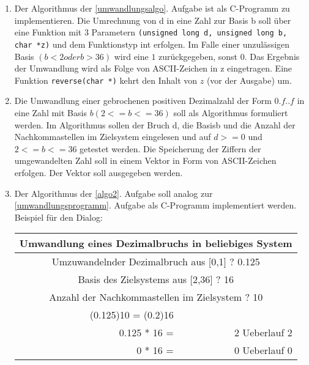 \documentclass[12pt,a4paper]{scrreprt}
\begin{document}
\begin{enumerate}
\item\label{umwandlungsprogramm} %
Der Algorithmus der \ref{umwandlungsalgo}. Aufgabe ist als C-Programm zu implementieren. Die Umrechnung von d in eine Zahl zur Basis b soll über eine Funktion mit $3$ Parametern \texttt{(unsigned long d, unsigned long b, char *z)} und dem Funktionstyp int erfolgen. Im Falle einer unzulässigen Basis $(b<2 oder b>36)$ wird eine $1$ zurückgegeben, sonst 0. Das Ergebnis der Umwandlung wird als Folge von ASCII-Zeichen in z eingetragen. Eine Funktion \texttt{reverse(char *)} kehrt den Inhalt von $z$ (vor der Ausgabe) um.

\item\label{algo2} %
Die Umwandlung einer gebrochenen positiven Dezimalzahl der Form $0.f..f$ in eine Zahl mit Basis $b (2 <= b <= 36)$ soll als Algorithmus formuliert werden. Im Algorithmus sollen der Bruch d, die Basisb und die Anzahl der Nachkommastellen im Zielsystem eingelesen und auf $d >= 0$ und $2 <= b <= 36$ getestet werden. 
Die Speicherung der Ziffern der umgewandelten Zahl soll in einem Vektor in Form von ASCII-Zeichen erfolgen. Der Vektor soll ausgegeben werden.

\item %
Der Algorithmus der \ref{algo2}. Aufgabe soll analog zur \ref{umwandlungsprogramm}. Aufgabe als C-Programm implementiert werden. Beispiel für den Dialog:

\begin{tabular}{rr}
\multicolumn{2}{c}{Umwandlung eines Dezimalbruchs in beliebiges System} \\
\hline
\multicolumn{2}{c}{Umzuwandelnder Dezimalbruch aus [0,1] ? 0.125}	\\
\multicolumn{2}{c}{Basis des Zielsystems aus [2,36] ? 16}	\\
\multicolumn{2}{c}{Anzahl der Nachkommastellen im Zielsystem ? 10}	\\
(0.125)10 = (0.2)16 &	\\
0.125 * 16 = &	2 Ueberlauf 2	\\
0 * 16 = &	0 Ueberlauf 0	
\end{tabular}

\end{enumerate}
\end{document}
